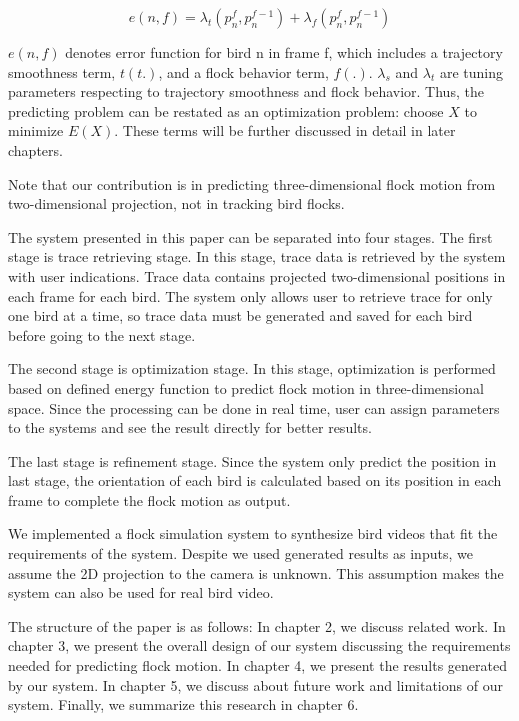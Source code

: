 \begin{equation}\label{eq:2}
 e(n,f) = \lambda_t(p_n^f, p_n^{f-1}) + \lambda_f(p_n^f, p_n^{f-1})
\end{equation}


$e(n,f)$ denotes error function for bird n in frame f, which includes a trajectory smoothness term, $t(t.)$, and a flock behavior term, $f(.)$. $\lambda_s$ and $\lambda_t$ are tuning parameters respecting to trajectory smoothness and flock behavior. Thus, the predicting problem can be restated as an optimization problem: choose $X$ to minimize $E(X)$. These terms will be further discussed in detail in later chapters.


Note that our contribution is in predicting three-dimensional flock motion from two-dimensional projection, not in tracking bird flocks.


The system presented in this paper can be separated into four stages. The first stage is trace retrieving stage. In this stage, trace data is retrieved by the system with user indications. Trace data contains projected two-dimensional positions in each frame for each bird. The system only allows user to retrieve trace for only one bird at a time, so trace data must be generated and saved for each bird before going to the next stage.


The second stage is optimization stage. In this stage, optimization is performed based on defined energy function to predict flock motion in three-dimensional space. Since the processing can be done in real time, user can assign parameters to the systems and see the result directly for better results.


The last stage is refinement stage. Since the system only predict the position in last stage, the orientation of each bird is calculated based on its position in each frame to complete the flock motion as output.


We implemented a flock simulation system to synthesize bird videos that fit the requirements of the system. Despite we used generated results as inputs, we assume the 2D projection to the camera is unknown. This assumption makes the system can also be used for real bird video.


The structure of the paper is as follows: In chapter 2, we discuss related work. In chapter 3, we present the overall design of our system discussing the requirements needed for predicting flock motion. In chapter 4, we present the results generated by our system. In chapter 5, we discuss about future work and limitations of our system. Finally, we summarize this research in chapter 6.

